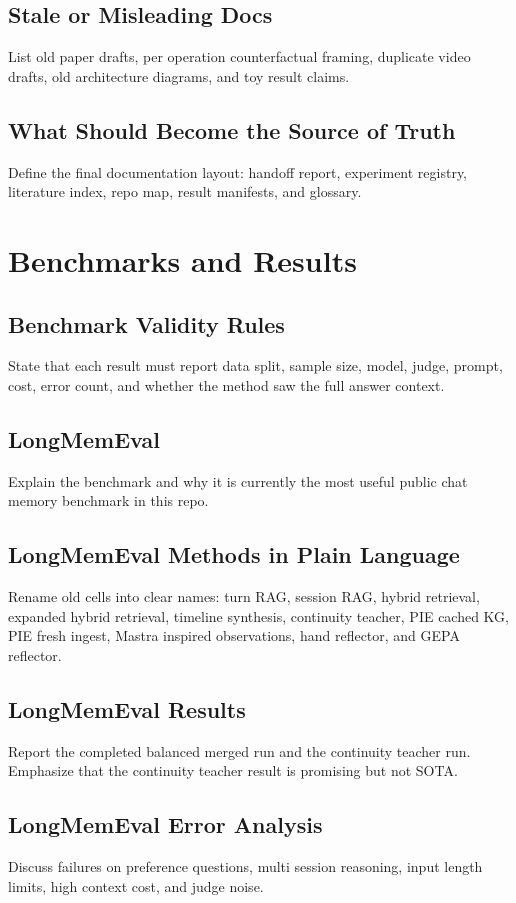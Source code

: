 \documentclass[11pt]{article}
\begin{document}
\subsection{Stale or Misleading Docs}
List old paper drafts, per operation counterfactual framing, duplicate video drafts, old architecture diagrams, and toy result claims.

\subsection{What Should Become the Source of Truth}
Define the final documentation layout: handoff report, experiment registry, literature index, repo map, result manifests, and glossary.

\section{Benchmarks and Results}

\subsection{Benchmark Validity Rules}
State that each result must report data split, sample size, model, judge, prompt, cost, error count, and whether the method saw the full answer context.

\subsection{LongMemEval}
Explain the benchmark and why it is currently the most useful public chat memory benchmark in this repo.

\subsection{LongMemEval Methods in Plain Language}
Rename old cells into clear names: turn RAG, session RAG, hybrid retrieval, expanded hybrid retrieval, timeline synthesis, continuity teacher, PIE cached KG, PIE fresh ingest, Mastra inspired observations, hand reflector, and GEPA reflector.

\subsection{LongMemEval Results}
Report the completed balanced merged run and the continuity teacher run. Emphasize that the continuity teacher result is promising but not SOTA.

\subsection{LongMemEval Error Analysis}
Discuss failures on preference questions, multi session reasoning, input length limits, high context cost, and judge noise.
\end{document}
